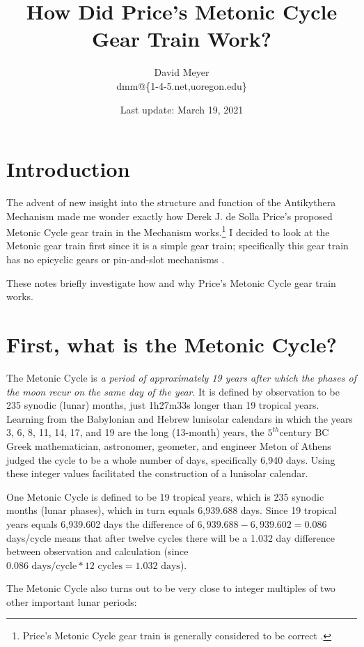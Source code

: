 \documentclass[11pt, oneside]{article}   	%
\title{How Did Price's Metonic Cycle Gear Train Work?}
\author{David Meyer \\ dmm@\{1-4-5.net,uoregon.edu\}}
\date{Last update: March 19, 2021}							%
\theoremstyle{definition}
\begin{document}
\maketitle

\section{Introduction}
The advent of new insight into the structure and function of the Antikythera Mechanism \cite{Freeth2021} made me wonder exactly how 
Derek J. de Solla Price's \cite{wiki:price} proposed Metonic Cycle gear train in the Mechanism works.\footnote{Price's Metonic Cycle gear train
is generally considered to be correct \cite{Freeth2006}.} I decided to look at the Metonic gear train first since it is a simple gear train; 
specifically this gear train has no epicyclic gears \cite{Wright2005} or pin-and-slot mechanisms \cite{Evans2010}.

\bigskip
\noindent
These notes briefly investigate how and why Price's Metonic Cycle gear train works.

\section{First, what is the Metonic Cycle?}
The Metonic Cycle is \emph{a period of approximately 19 years after which the phases of the moon recur on the same day of the year}. It is defined by 
observation to be 235 synodic (lunar) months,  just 1h27m33s longer than 19 tropical years. Learning from the Babylonian and Hebrew lunisolar calendars 
in which the years 3, 6, 8, 11, 14, 17, and 19 are the long (13-month) years, the $5^{th} \text{century BC}$ Greek mathematician, 
astronomer, geometer, and engineer Meton of Athens \cite{wiki:menton} judged the cycle to be a whole number of days, specifically 6,940 days. Using these integer 
values facilitated  the construction of a lunisolar calendar.

\bigskip
\noindent
One Metonic Cycle is defined to be 19 tropical years, which is 235 synodic months (lunar phases), which in turn equals 6,939.688 days. Since
19 tropical years equals 6,939.602 days the difference of  $6,939.688 - 6,939.602 = 0.086$ days/cycle means that after twelve cycles there 
will be a 1.032 day difference between observation and calculation (since $0.086 \text{ days/cycle} * 12 \text{ cycles} = 
1.032 \text{ days}$).  

\newpage

\noindent
The Metonic Cycle also turns out to be very close to integer multiples of two other important lunar periods:
\end{document}
